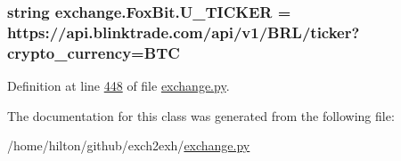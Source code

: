 \subsubsection[{\texorpdfstring{U\+\_\+\+T\+I\+C\+K\+ER}{U_TICKER}}]{\setlength{\rightskip}{0pt plus 5cm}string exchange.\+Fox\+Bit.\+U\+\_\+\+T\+I\+C\+K\+ER = \textquotesingle{}https\+://api.\+blinktrade.\+com/api/v1/B\+RL/{\bf ticker}?crypto\+\_\+currency=B\+TC\textquotesingle{}\hspace{0.3cm}{\ttfamily [static]}}\hypertarget{classexchange_1_1_fox_bit_a7ba3f64a2b55479da2239393c6140ec8}{}\label{classexchange_1_1_fox_bit_a7ba3f64a2b55479da2239393c6140ec8}


Definition at line \hyperlink{exchange_8py_source_l00448}{448} of file \hyperlink{exchange_8py_source}{exchange.\+py}.



The documentation for this class was generated from the following file\+:\begin{DoxyCompactItemize}
\item 
/home/hilton/github/exch2exh/\hyperlink{exchange_8py}{exchange.\+py}\end{DoxyCompactItemize}
